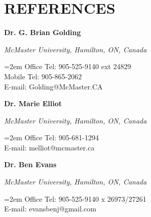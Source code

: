 \documentclass[paper=a4,fontsize=11pt]{scrartcl}	 			%
\newlength{\spacebox}
\newcommand{\NewPart}[1]{\section*{\uppercase{#1}}}
\newcommand{\PersonalEntry}[2]{
		\noindent\hangindent=2em\hangafter=0 		%
		\parbox{\spacebox}{						%
		\textit{#1}}								%
		\hspace{1.5em} #2 \par}					%
\newcommand{\SkillsEntry}[2]{						%
		\noindent\hangindent=2em\hangafter=0 		%
		\parbox{\spacebox}{						%
		\textit{#1}}								%
		\hspace{1.5em} #2 \par}					%
\newcommand{\EducationEntry}[4]{
		\noindent \textbf{#1} \hfill 					%
		\colorbox{White}{%
			\parbox{10em}{%
			\hfill\color{Black}#2}} \par				%
		\noindent \textit{#3} \par					%
		\noindent\hangindent=2em\hangafter=0 \small #4 	%
		\normalsize \par}
\newcommand{\WorkEntry}[4]{						%
		\noindent \textbf{#1} \hfill 					%
		\colorbox{White}{\color{Black}#2} \par		%
		\noindent \textit{#3} \par					%
		\noindent\hangindent=2em\hangafter=0 \small #4 	%
		\normalsize \par}
\newcommand{\ServiceEntry}[2]{					%
		\noindent \textit{#1} \par					%
		\noindent\hangindent=2em\hangafter=0 \small #2 	%
		\normalsize \par}
\begin{document}
%
%
%
%
%
\newpage
\NewPart{References}{}
\WorkEntry{Dr. G. Brian Golding}{}{McMaster University, Hamilton, ON, Canada}{Office Tel: 905-525-9140 ext 24829 \\ 
Mobile Tel: 905-865-2062 \\
E-mail: Golding@McMaster.CA}

\WorkEntry{Dr. Marie Elliot}{}{McMaster University, Hamilton, ON, Canada}{Office Tel: 905-681-1294 \\ 
	E-mail: melliot@mcmaster.ca}

\WorkEntry{Dr. Ben Evans}{}{McMaster University, Hamilton, ON, Canada}{Office Tel: 905-525-9140 x 26973/27261 \\ 
	E-mail: evansbenj@gmail.com}
%
\end{document}
